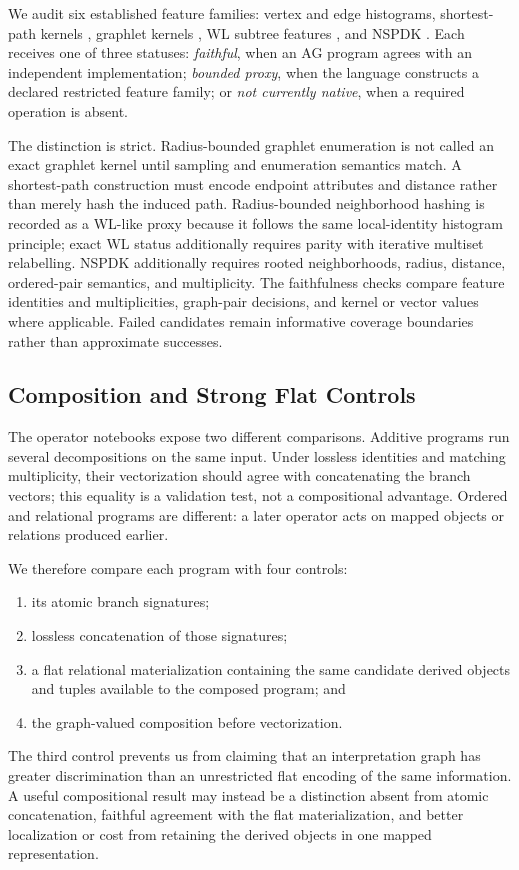 We audit six established feature families: vertex and edge histograms,
shortest-path kernels \cite{Borgwardt2005ShortestPath}, graphlet kernels
\cite{Shervashidze2009Graphlet}, WL subtree features
\cite{Shervashidze2011WeisfeilerLehman}, and NSPDK
\cite{Costa2010NSPDK}. Each receives one of three statuses: \emph{faithful},
when an AG program agrees with an independent implementation; \emph{bounded
proxy}, when the language constructs a declared restricted feature family; or
\emph{not currently native}, when a required operation is absent.

The distinction is strict. Radius-bounded graphlet enumeration is not called an
exact graphlet kernel until sampling and enumeration semantics match. A
shortest-path construction must encode endpoint attributes and distance rather
than merely hash the induced path. Radius-bounded neighborhood hashing is
recorded as a WL-like proxy because it follows the same local-identity histogram
principle; exact WL status additionally requires parity with iterative multiset
relabelling. NSPDK additionally requires rooted
neighborhoods, radius, distance, ordered-pair semantics, and multiplicity. The
faithfulness checks compare feature identities and multiplicities, graph-pair
decisions, and kernel or vector values where applicable. Failed candidates
remain informative coverage boundaries rather than approximate successes.

\subsection{Composition and Strong Flat Controls}

The operator notebooks expose two different comparisons. Additive programs run
several decompositions on the same input. Under lossless identities and matching
multiplicity, their vectorization should agree with concatenating the branch
vectors; this equality is a validation test, not a compositional advantage.
Ordered and relational programs are different: a later operator acts on mapped
objects or relations produced earlier.

We therefore compare each program with four controls:
\begin{enumerate}
  \item its atomic branch signatures;
  \item lossless concatenation of those signatures;
  \item a flat relational materialization containing the same candidate derived
        objects and tuples available to the composed program; and
  \item the graph-valued composition before vectorization.
\end{enumerate}
The third control prevents us from claiming that an interpretation graph has
greater discrimination than an unrestricted flat encoding of the same
information. A useful compositional result may instead be a distinction absent
from atomic concatenation, faithful agreement with the flat materialization,
and better localization or cost from retaining the derived objects in one
mapped representation.

